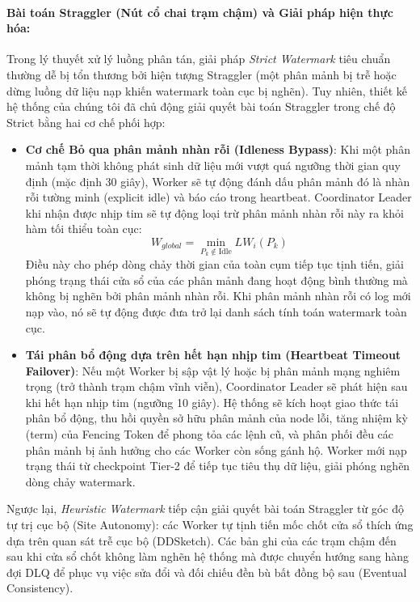 \documentclass[12pt,a4paper]{article}
\begin{document}
\paragraph{Bài toán Straggler (Nút cổ chai trạm chậm) và Giải pháp hiện thực hóa:}
Trong lý thuyết xử lý luồng phân tán, giải pháp \textit{Strict Watermark} tiêu chuẩn thường dễ bị tổn thương bởi hiện tượng Straggler (một phân mảnh bị trễ hoặc dừng luồng dữ liệu nạp khiến watermark toàn cục bị nghẽn). Tuy nhiên, thiết kế hệ thống của chúng tôi đã chủ động giải quyết bài toán Straggler trong chế độ Strict bằng hai cơ chế phối hợp:
\begin{itemize}
    \item \textbf{Cơ chế Bỏ qua phân mảnh nhàn rỗi (Idleness Bypass)}: Khi một phân mảnh tạm thời không phát sinh dữ liệu mới vượt quá ngưỡng thời gian quy định (mặc định 30 giây), Worker sẽ tự động đánh dấu phân mảnh đó là nhàn rỗi tường minh (explicit idle) và báo cáo trong heartbeat. Coordinator Leader khi nhận được nhịp tim sẽ tự động loại trừ phân mảnh nhàn rỗi này ra khỏi hàm tối thiểu toàn cục:
    {\large
    \begin{equation}
        \boxed{W_{global} = \min_{P_k \notin \text{Idle}} LW_i(P_k)}
    \end{equation}
    }
    Điều này cho phép dòng chảy thời gian của toàn cụm tiếp tục tịnh tiến, giải phóng trạng thái cửa sổ của các phân mảnh đang hoạt động bình thường mà không bị nghẽn bởi phân mảnh nhàn rỗi. Khi phân mảnh nhàn rỗi có log mới nạp vào, nó sẽ tự động được đưa trở lại danh sách tính toán watermark toàn cục.
    \item \textbf{Tái phân bổ động dựa trên hết hạn nhịp tim (Heartbeat Timeout Failover)}: Nếu một Worker bị sập vật lý hoặc bị phân mảnh mạng nghiêm trọng (trở thành trạm chậm vĩnh viễn), Coordinator Leader sẽ phát hiện sau khi hết hạn nhịp tim (ngưỡng 10 giây). Hệ thống sẽ kích hoạt giao thức tái phân bổ động, thu hồi quyền sở hữu phân mảnh của node lỗi, tăng nhiệm kỳ (term) của Fencing Token để phong tỏa các lệnh cũ, và phân phối đều các phân mảnh bị ảnh hưởng cho các Worker còn sống gánh hộ. Worker mới nạp trạng thái từ checkpoint Tier-2 để tiếp tục tiêu thụ dữ liệu, giải phóng nghẽn dòng chảy watermark.
\end{itemize}

Ngược lại, \textit{Heuristic Watermark} tiếp cận giải quyết bài toán Straggler từ góc độ tự trị cục bộ (Site Autonomy): các Worker tự tịnh tiến mốc chốt cửa sổ thích ứng dựa trên quan sát trễ cục bộ (DDSketch). Các bản ghi của các trạm chậm đến sau khi cửa sổ chốt không làm nghẽn hệ thống mà được chuyển hướng sang hàng đợi DLQ để phục vụ việc sửa đổi và đối chiếu đền bù bất đồng bộ sau (Eventual Consistency).
\end{document}
